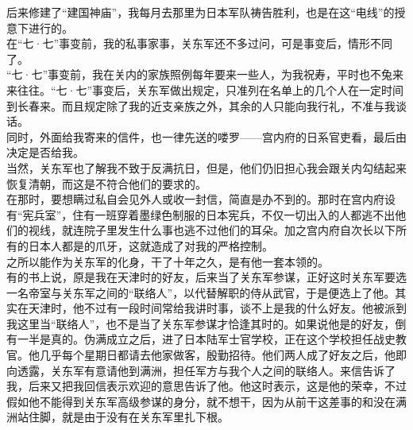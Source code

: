 后来修建了“建国神庙”，我每月去那里为日本军队祷告胜利，也是在这“电线”的授意下进行的。\\

在“七·七”事变前，我的私事家事，关东军还不多过问，可是事变后，情形不同了。\\

“七·七”事变前，我在关内的家族照例每年要来一些人，为我祝寿，平时也不兔来来往往。“七·七”事变后，关东军做出规定，只准列在名单上的几个人在一定时间到长春来。而且规定除了我的近支亲族之外，其余的人只能向我行礼，不准与我谈话。\\

同时，外面给我寄来的信件，也一律先送的喽罗——宫内府的日系官吏看，最后由决定是否给我。\\

当然，关东军也了解我不致于反满抗日，但是，他们仍旧担心我会跟关内勾结起来恢复清朝，而这是不符合他们的要求的。\\

在那时，要想瞒过私自会见外人或收一封信，简直是办不到的。那时在宫内府设有“宪兵室”，住有一班穿着墨绿色制服的日本宪兵，不仅一切出入的人都逃不出他们的视线，就连院子里发生什么事也逃不过他们的耳朵。加之宫内府自次长以下所有的日本人都是的爪牙，这就造成了对我的严格控制。\\

之所以能作为关东军的化身，干了十年之久，是有他一套本领的。\\

有的书上说，原是我在天津时的好友，后来当了关东军参谋，正好这时关东军要选一名帝室与关东军之间的“联络人”，以代替解职的侍从武官，于是便选上了他。其实在天津时，他不过有一段时间常给我讲时事，谈不上是我的什么好友。他被派到我这里当“联络人”，也不是当了关东军参谋才恰逢其时的。如果说他是的好友，倒有一半是真的。伪满成立之后，进了日本陆军士官学校，正在这个学校担任战史教官。他几乎每个星期日都请去他家做客，殷勤招待。他们两人成了好友之后，他即向透露，关东军有意请他到满洲，担任军方与我个人之间的联络人。来信告诉了我，后来又把我回信表示欢迎的意思告诉了他。他这时表示，这是他的荣幸，不过假如他不能得到关东军高级参谋的身分，就不想干，因为从前干这差事的和没在满洲站住脚，就是由于没有在关东军里扎下根。\\

